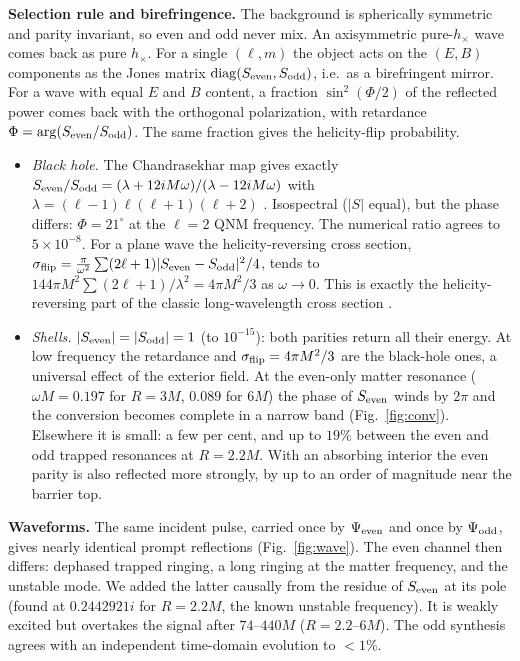 \documentclass[10pt,a4paper]{article}
\begin{document}
\textbf{Selection rule and birefringence.} The background is spherically symmetric and parity invariant, so even and odd
never mix. An axisymmetric pure-$h_\times$ wave comes back as pure $h_\times$. For a single $(\ell,m)$ the object acts on the
$(E,B)$ components as the Jones matrix ${\rm diag}(S_{\rm even},S_{\rm odd})$, i.e.\ as a birefringent mirror. For a wave with
equal $E$ and $B$ content, a fraction $\sin^2(\Phi/2)$ of the reflected power comes back with the orthogonal polarization,
with retardance $\Phi=\arg(S_{\rm even}/S_{\rm odd})$. The same fraction gives the helicity-flip probability.
\begin{itemize}
\item \emph{Black hole.} The Chandrasekhar map gives exactly $S_{\rm even}/S_{\rm odd}=(\lambda+12iM\omega)/(\lambda-12iM\omega)$ with
$\lambda=(\ell-1)\ell(\ell+1)(\ell+2)$ \cite{Chandrasekhar83}. Isospectral ($|S|$ equal), but the phase differs: $\Phi=21^\circ$ at the $\ell=2$ QNM
frequency. The numerical ratio agrees to $5\times10^{-8}$. For a plane wave the helicity-reversing cross section,
$\sigma_{\rm flip}=\frac{\pi}{\omega^2}\sum(2\ell+1)|S_{\rm even}-S_{\rm odd}|^2/4$, tends to $144\pi M^2\sum(2\ell+1)/\lambda^2=4\pi M^2/3$ as
$\omega\to0$. This is exactly the helicity-reversing part of the classic long-wavelength cross section \cite{Peters76,Dolan08}.
\item \emph{Shells.} $|S_{\rm even}|=|S_{\rm odd}|=1$ (to $10^{-15}$): both parities return all their energy. At low frequency the
retardance and $\sigma_{\rm flip}=4\pi M^2/3$ are the black-hole ones, a universal effect of the exterior field. At the
even-only matter resonance ($\omega M=0.197$ for $R=3M$, $0.089$ for $6M$) the phase of $S_{\rm even}$ winds by $2\pi$ and the
conversion becomes complete in a narrow band (Fig.~\ref{fig:conv}). Elsewhere it is small: a few per cent, and up to
$19\%$ between the even and odd trapped resonances at $R=2.2M$. With an absorbing interior the even parity is also
reflected more strongly, by up to an order of magnitude near the barrier top.
\end{itemize}

\textbf{Waveforms.} The same incident pulse, carried once by $\Psi_{\rm even}$ and once by $\Psi_{\rm odd}$, gives nearly identical
prompt reflections (Fig.~\ref{fig:wave}). The even channel then differs: dephased trapped ringing, a long ringing at the
matter frequency, and the unstable mode. We added the latter causally from the residue of $S_{\rm even}$ at its pole (found at
$0.2442921i$ for $R=2.2M$, the known unstable frequency). It is weakly excited but overtakes the signal after
$74$--$440M$ ($R=2.2$--$6M$). The odd synthesis agrees with an independent time-domain evolution to $<1\%$.
\end{document}
